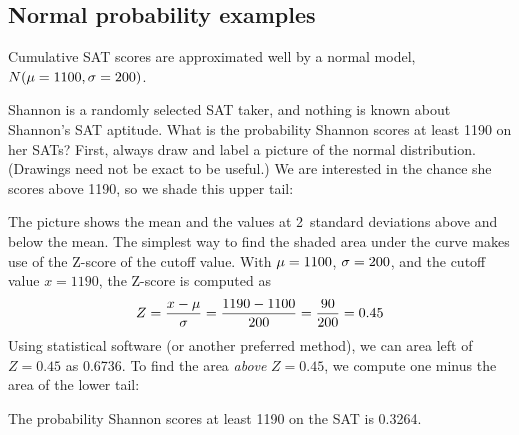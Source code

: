 

\subsection{Normal probability examples}
\label{normal_probability_examples}

\noindent%
Cumulative SAT scores are approximated well by a normal model,
$N(\mu = 1100{}, \sigma = 200{})$.

\newcommand{\shannonsat}{1190}
\newcommand{\shannonsatz}{0.45}
\begin{examplewrap}
\begin{nexample}{Shannon is a randomly selected SAT taker,
    and nothing is known about Shannon's SAT aptitude.
    What is the probability Shannon scores at least
    \shannonsat{} on her SATs?}
  \label{satAbove1190Exam}%
  First, always draw and label a picture of the normal
  distribution.
  (Drawings need not be exact to be useful.)
  We are interested in the chance she scores above
  \shannonsat{}, so we shade this upper tail:
  \begin{center}
  \end{center}
  The picture shows the mean and the values at
  2~standard deviations above and below the mean.
  The simplest way to find the shaded area under
  the curve makes use of the Z-score of the cutoff value.
  With $\mu = 1100{}$, $\sigma = 200{}$,
  and the cutoff value $x = \shannonsat{}$,
  the Z-score is computed as
  \begin{align*}
  Z = \frac{x - \mu}{\sigma}
    = \frac{\shannonsat{} - \satmean{}}{\satsd{}}
    = \frac{90}{\satsd{}}
    = \shannonsatz{}
  \end{align*}
  Using statistical software (or another preferred method),
  we can area left of $Z = \shannonsatz{}$ as 0.6736.
  To find the area \emph{above} $Z = \shannonsatz{}$,
  we compute one minus the area of the lower tail:
  \begin{center}
  \end{center}
  The probability Shannon scores at least 1190 on the SAT
  is 0.3264.
\end{nexample}
\end{examplewrap}

